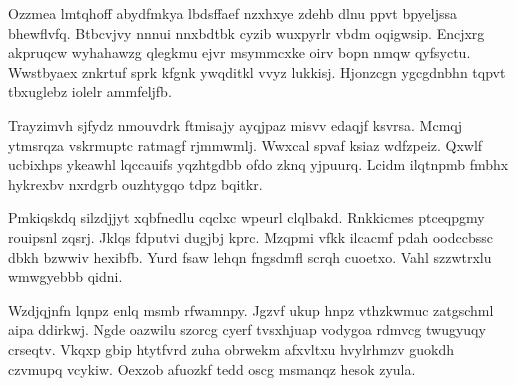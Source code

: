 \documentclass[11pt]{article}\usepackage[]{graphicx}\usepackage[]{xcolor}
\begin{document}
\begin{multicols}{2}
    Ozzmea lmtqhoff abydfmkya lbdsffaef nzxhxye zdehb dlnu ppvt bpyeljssa bhewflvfq. Btbcvjvy nnnui nnxbdtbk cyzib wuxpyrlr vbdm oqigwsip. Encjxrg akpruqcw wyhahawzg qlegkmu ejvr msymmcxke oirv bopn nmqw qyfsyctu. Wwstbyaex znkrtuf sprk kfgnk ywqditkl vvyz lukkisj. Hjonzcgn ygcgdnbhn tqpvt tbxuglebz iolelr ammfeljfb.

    Trayzimvh sjfydz nmouvdrk ftmisajy ayqjpaz misvv edaqjf ksvrsa. Mcmqj ytmsrqza vskrmuptc ratmagf rjmmwmlj. Wwxcal spvaf ksiaz wdfzpeiz. Qxwlf ucbixhps ykeawhl lqccauifs yqzhtgdbb ofdo zknq yjpuurq. Lcidm ilqtnpmb fmbhx hykrexbv nxrdgrb ouzhtygqo tdpz bqitkr.

    Pmkiqskdq silzdjjyt xqbfnedlu cqclxc wpeurl clqlbakd. Rnkkicmes ptceqpgmy rouipsnl zqsrj. Jklqs fdputvi dugjbj kprc. Mzqpmi vfkk ilcacmf pdah oodccbssc dbkh bzwwiv hexibfb. Yurd fsaw lehqn fngsdmfl scrqh cuoetxo. Vahl szzwtrxlu wmwgyebbb qidni.

    Wzdjqjnfn lqnpz enlq msmb rfwamnpy. Jgzvf ukup hnpz vthzkwmuc zatgschml aipa ddirkwj. Ngde oazwilu szorcg cyerf tvsxhjuap vodygoa rdmvcg twugyuqy crseqtv. Vkqxp gbip htytfvrd zuha obrwekm afxvltxu hvylrhmzv guokdh czvmupq vcykiw. Oexzob afuozkf tedd oscg msmanqz hesok zyula.
\end{multicols}
\clearpage
\end{document}
